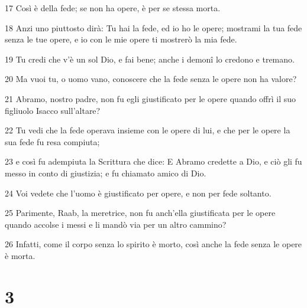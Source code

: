 \par 17 Così è della fede; se non ha opere, è per se stessa morta.
\par 18 Anzi uno piuttosto dirà: Tu hai la fede, ed io ho le opere; mostrami la tua fede senza le tue opere, e io con le mie opere ti mostrerò la mia fede.
\par 19 Tu credi che v'è un sol Dio, e fai bene; anche i demonî lo credono e tremano.
\par 20 Ma vuoi tu, o uomo vano, conoscere che la fede senza le opere non ha valore?
\par 21 Abramo, nostro padre, non fu egli giustificato per le opere quando offrì il suo figliuolo Isacco sull'altare?
\par 22 Tu vedi che la fede operava insieme con le opere di lui, e che per le opere la sua fede fu resa compiuta;
\par 23 e così fu adempiuta la Scrittura che dice: E Abramo credette a Dio, e ciò gli fu messo in conto di giustizia; e fu chiamato amico di Dio.
\par 24 Voi vedete che l'uomo è giustificato per opere, e non per fede soltanto.
\par 25 Parimente, Raab, la meretrice, non fu anch'ella giustificata per le opere quando accolse i messi e li mandò via per un altro cammino?
\par 26 Infatti, come il corpo senza lo spirito è morto, così anche la fede senza le opere è morta.

\chapter{3}

